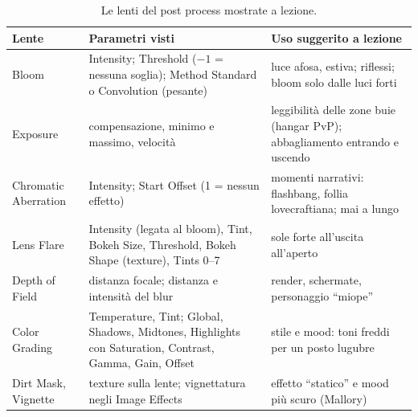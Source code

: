 \begin{table}[htbp]
\centering
\small
\begin{tabular}{@{}p{3.0cm}p{6.0cm}p{5.0cm}@{}}
\toprule
\textbf{Lente} & \textbf{Parametri visti} & \textbf{Uso suggerito a lezione} \\
\midrule
Bloom & Intensity; Threshold ($-1$ = nessuna soglia); Method Standard o Convolution
(pesante) & luce afosa, estiva; riflessi; bloom solo dalle luci forti \\
Exposure & compensazione, minimo e massimo, velocità & leggibilità delle zone buie (hangar
PvP); abbagliamento entrando e uscendo \\
Chromatic Aberration & Intensity; Start Offset (1 = nessun effetto) & momenti narrativi:
flashbang, follia lovecraftiana; mai a lungo \\
Lens Flare & Intensity (legata al bloom), Tint, Bokeh Size, Threshold, Bokeh Shape
(texture), Tints 0--7 & sole forte all'uscita all'aperto \\
Depth of Field & distanza focale; distanza e intensità del blur & render, schermate,
personaggio ``miope'' \\
Color Grading & Temperature, Tint; Global, Shadows, Midtones, Highlights con Saturation,
Contrast, Gamma, Gain, Offset & stile e mood: toni freddi per un posto lugubre \\
Dirt Mask, Vignette & texture sulla lente; vignettatura negli Image Effects & effetto
``statico'' e mood più scuro (Mallory) \\
\bottomrule
\end{tabular}
\caption{Le lenti del post process mostrate a lezione.}
\label{ue16:tab:lenti}
\end{table}

